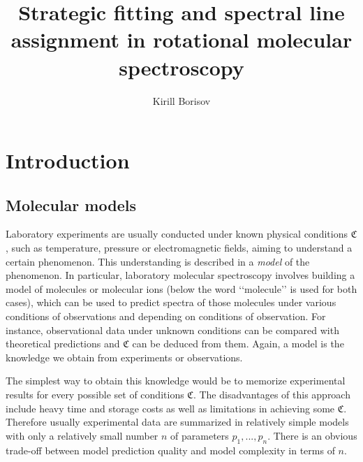 \documentclass[11pt]{article}
\title{Strategic fitting and spectral line assignment in rotational molecular spectroscopy}
\author{Kirill Borisov}
\begin{document}
\begin{titlepage}
\maketitle
\end{titlepage}

\tableofcontents
\newpage

\section{Introduction}



\subsection{Molecular models}

Laboratory experiments are usually conducted under known physical conditions $\mathfrak{C}$, such as temperature, pressure or electromagnetic fields, aiming to understand a certain phenomenon. This understanding is described in a \emph{model} of the phenomenon. In particular, laboratory molecular spectroscopy involves building a model of molecules or molecular ions (below the word \lq\lq{}molecule\rq\rq{} is used for both cases), which can be used to predict spectra of those molecules under various conditions of observations and depending on conditions of observation. For instance, observational data under unknown conditions can be compared with theoretical predictions and $\mathfrak{C}$ can be deduced from them. Again, a model is the knowledge we obtain from experiments or observations. 

The simplest way to obtain this knowledge would be to memorize experimental results for every possible set of conditions $\mathfrak{C}$. The disadvantages of this approach include heavy time and storage costs as well as limitations in achieving some $\mathfrak{C}$. Therefore usually experimental data are summarized in relatively simple models with only a relatively small number $n$ of parameters $p_1, ..., p_n$. There is an obvious trade-off between model prediction quality and model complexity in terms of $n$.
\end{document}
